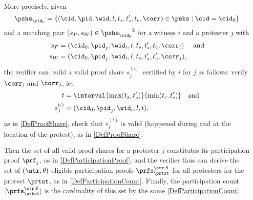 More precisely, given \[
  \pshs_{\cid_0} = \{ (\cid, \pid, \wid, l, t_s, t_s', t_c, \corr) \in \pshs 
  \mid \cid = \cid_0 \}
\] and a matching pair \((s_P, s_W) \in {\pshs_{\cid_0}}^2\) for a witness 
\(i\) and a protester \(j\) with
\begin{align*}
  s_P &= (\cid_0, \pid_j, \wid_i, l, t_s, t_s', t_c, \corr_i) &\text{and} \\
  s_W &= (\cid_0, \pid_j, \wid_i, l, t_s, t_s', t_c', \corr_j),
\end{align*}
the verifier can build a valid proof share \(s_j^{(i)}\) certified by \(i\) for 
\(j\) as follows:
verify \(\corr_i\) and \(\corr_j\),
let
\begin{align*}
  t &= \interval{\max(t_s, t_s')}{\min(t_c, t_c')} &\text{and} \\
  s_j^{(i)} &= (\cid_0, \pid_j, \wid_i, l, t),
\end{align*}
as in \cref{DefProofShare},
check that \(s_j^{(i)}\) is valid (\ie happened during and at the location of 
the protest), as in \cref{DefProofShare}.

Then the set of all valid proof shares for a protester \(j\) constitutes its 
participation proof \(\prf_{j}\), as in \cref{DefParticipationProof},
and the verifier thus can derive the set of \((\str,\theta)\)-eligible participation proofs \(\prfs_{\prtst}^{\str,\theta}\) for all protesters for the protest \(\prtst\), as in \cref{DefParticipationCount}.
Finally, the  participation count \(|\prfs_{\prtst}^{\str,\theta}|\) is the cardinality of this set by the same \cref{DefParticipationCount}.





